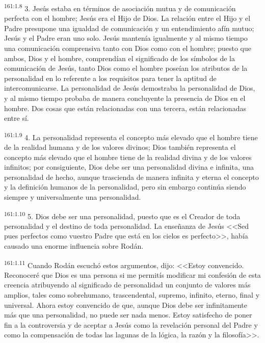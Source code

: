 \par 
\textsuperscript{161:1.8} 3. Jesús estaba en términos de asociación mutua y de comunicación perfecta con el hombre; Jesús era el Hijo de Dios. La relación entre el Hijo y el Padre presupone una igualdad de comunicación y un entendimiento afín mutuo; Jesús y el Padre eran uno solo. Jesús mantenía igualmente y al mismo tiempo una comunicación comprensiva tanto con Dios como con el hombre; puesto que ambos, Dios y el hombre, comprendían el significado de los símbolos de la comunicación de Jesús, tanto Dios como el hombre poseían los atributos de la personalidad en lo referente a los requisitos para tener la aptitud de intercomunicarse. La personalidad de Jesús demostraba la personalidad de Dios, y al mismo tiempo probaba de manera concluyente la presencia de Dios en el hombre. Dos cosas que están relacionadas con una tercera, están relacionadas entre sí.

\par 
\textsuperscript{161:1.9} 4. La personalidad representa el concepto más elevado que el hombre tiene de la realidad humana y de los valores divinos; Dios también representa el concepto más elevado que el hombre tiene de la realidad divina y de los valores infinitos; por consiguiente, Dios debe ser una personalidad divina e infinita, una personalidad de hecho, aunque trascienda de manera infinita y eterna el concepto y la definición humanos de la personalidad, pero sin embargo continúa siendo siempre y universalmente una personalidad.

\par 
\textsuperscript{161:1.10} 5. Dios debe ser una personalidad, puesto que es el Creador de toda personalidad y el destino de toda personalidad. La enseñanza de Jesús <<Sed pues perfectos como vuestro Padre que está en los cielos es perfecto>>, había causado una enorme influencia sobre Rodán.

\par 
\textsuperscript{161:1.11} Cuando Rodán escuchó estos argumentos, dijo: <<Estoy convencido. Reconoceré que Dios es una persona si me permitís modificar mi confesión de esta creencia atribuyendo al significado de personalidad un conjunto de valores más amplios, tales como sobrehumano, trascendental, supremo, infinito, eterno, final y universal. Ahora estoy convencido de que, aunque Dios debe ser infinitamente más que una personalidad, no puede ser nada menos. Estoy satisfecho de poner fin a la controversia y de aceptar a Jesús como la revelación personal del Padre y como la compensación de todas las lagunas de la lógica, la razón y la filosofía>>.

